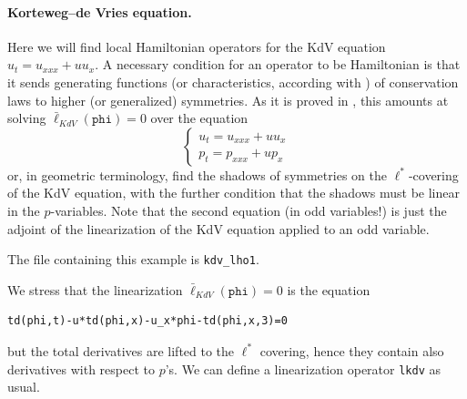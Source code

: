 \paragraph*{Korteweg--de Vries equation.}
\label{cdesec:korteweg-de-vries}
Here we will find local Hamiltonian operators for the KdV equation
$u_t=u_{xxx}+uu_x$. A necessary condition for an operator to be Hamiltonian is
that it sends generating functions (or characteristics, according with
\cite{Olver:93}) of conservation laws to higher (or generalized) symmetries.
As it is proved in \cite{KerstenKrasilshchikVerboretsky:2004}, this amounts at solving $\bar
\ell_{KdV}(\mathtt{phi})=0$ over the equation
\[
  \left\{\begin{array}{l}
    u_t=u_{xxx}+uu_x\\
    p_t=p_{xxx}+up_x
  \end{array}\right.
\]
or, in geometric terminology, find the shadows of symmetries on the
$\ell^*$-covering of the KdV equation, with the further condition that the
shadows must be linear in the $p$-variables. Note that the second equation (in
odd variables!) is just the adjoint of the linearization of the KdV equation
applied to an odd variable.

The file containing this example is \texttt{kdv\_lho1}.

We stress that the linearization $\bar \ell_{KdV}(\mathtt{phi})=0$ is the
equation
\begin{verbatim}
td(phi,t)-u*td(phi,x)-u_x*phi-td(phi,x,3)=0
\end{verbatim}
but the total derivatives are lifted to the $\ell^*$ covering, hence they
contain also derivatives with respect to $p$'s. We can define a linearization
operator \texttt{lkdv} as usual.

